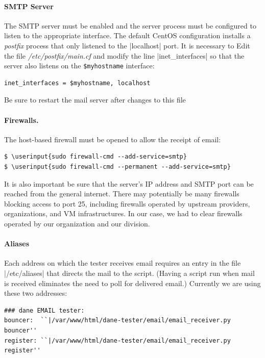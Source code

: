 \documentclass[preprint,3p,11pt]{elsarticle}
\newcommand\userinput[1]{\textbf{#1}}
\begin{document}
\paragraph{SMTP Server}

The SMTP server must be enabled and the server process must be
configured to listen to the appropriate interface. The default CentOS
configuration installs a \emph{postfix} process that only listened to
the |localhost| port. It is necessary to Edit the file
  \emph{/etc/postfix/main.cf} and modify the line |inet_interfaces| so
  that the server also listens on the \texttt{\$myhostname} interface:

\begin{Verbatim}[commandchars=\\\{\}]
inet_interfaces = $myhostname, localhost
\end{Verbatim}

Be sure to restart the mail server after changes to this file

\paragraph{Firewalls.} The host-based firewall must be opened to allow the receipt of email:

\begin{Verbatim}[commandchars=\\\{\}]
$ \userinput{sudo firewall-cmd --add-service=smtp}
$ \userinput{sudo firewall-cmd --permanent --add-service=smtp}
\end{Verbatim}

It is also important be sure that the server's IP address and SMTP
port can be reached from the general internet. There may potentially
be many firewalls blocking access to port 25, including firewalls
operated by upstream providers, organizations, and VM
infrastructures. In our case, we had to clear firewalls operated by
our organization and our division.

\paragraph{Aliases}

Each address on which the tester receives email requires an entry in
the file |/etc/aliases| that directs the mail to the script. (Having a
script run when mail is received eliminates the need to poll for
delivered email.)  Currently we are using these two addresses:

\begin{Verbatim}[commandchars=\\\{\}]
### dane EMAIL tester:
bouncer:  ``|/var/www/html/dane-tester/email/email_receiver.py bouncer''
register: ``|/var/www/html/dane-tester/email/email_receiver.py register''
\end{Verbatim}
\end{document}

